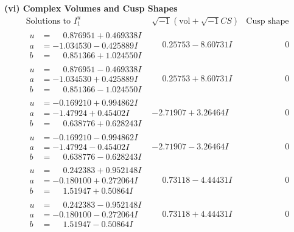 \documentclass[1p]{elsarticle_modified}
\theoremstyle{definition}
\newcommand{\I}{\sqrt{-1}}
\begin{document}
\newpage\flushleft \textbf{(vi) Complex Volumes and Cusp Shapes}
$$\begin{array}{c|c|c}  
\text{Solutions to }I^u_{1}& \I (\text{vol} + \sqrt{-1}CS) & \text{Cusp shape}\\
 \hline 
\begin{aligned}
u &= \phantom{-}0.876951 + 0.469338 I \\
a &= -1.034530 - 0.425889 I \\
b &= \phantom{-}0.851366 + 1.024550 I\end{aligned}
 & \phantom{-}0.25753 - 8.60731 I & \phantom{-0.000000 } 0 \\ \hline\begin{aligned}
u &= \phantom{-}0.876951 - 0.469338 I \\
a &= -1.034530 + 0.425889 I \\
b &= \phantom{-}0.851366 - 1.024550 I\end{aligned}
 & \phantom{-}0.25753 + 8.60731 I & \phantom{-0.000000 } 0 \\ \hline\begin{aligned}
u &= -0.169210 + 0.994862 I \\
a &= -1.47924 + 0.45402 I \\
b &= \phantom{-}0.638776 + 0.628243 I\end{aligned}
 & -2.71907 + 3.26464 I & \phantom{-0.000000 } 0 \\ \hline\begin{aligned}
u &= -0.169210 - 0.994862 I \\
a &= -1.47924 - 0.45402 I \\
b &= \phantom{-}0.638776 - 0.628243 I\end{aligned}
 & -2.71907 - 3.26464 I & \phantom{-0.000000 } 0 \\ \hline\begin{aligned}
u &= \phantom{-}0.242383 + 0.952148 I \\
a &= -0.180100 + 0.272064 I \\
b &= \phantom{-}1.51947 + 0.50864 I\end{aligned}
 & \phantom{-}0.73118 - 4.44431 I & \phantom{-0.000000 } 0 \\ \hline\begin{aligned}
u &= \phantom{-}0.242383 - 0.952148 I \\
a &= -0.180100 - 0.272064 I \\
b &= \phantom{-}1.51947 - 0.50864 I\end{aligned}
 & \phantom{-}0.73118 + 4.44431 I & \phantom{-0.000000 } 0 \\ \hline\begin{aligned}

\end{aligned}
\end{array}$$
\end{document}
